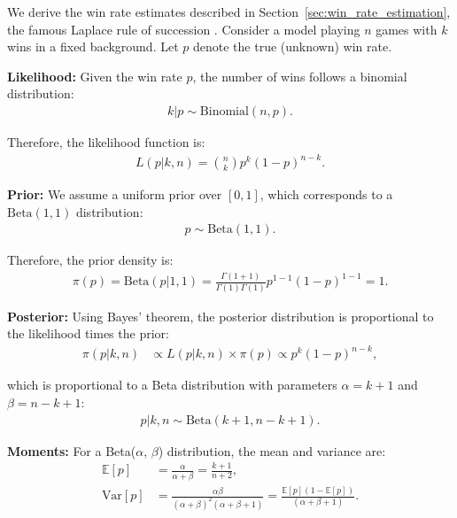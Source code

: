 \documentclass{article}
\begin{document}
    We derive the win rate estimates described in Section~\ref{sec:win_rate_estimation}, the famous Laplace rule of succession \cite{Laplace1812}. Consider a model playing $n$ games with $k$ wins in a fixed background. Let $p$ denote the true (unknown) win rate.

    \textbf{Likelihood:} Given the win rate $p$, the number of wins follows a binomial distribution:
    \begin{align}
    k | p \sim \text{Binomial}(n, p).
    \end{align}

    Therefore, the likelihood function is:
    \begin{align}
    L(p | k, n) = \binom{n}{k} p^k (1-p)^{n-k}.
    \end{align}

    \textbf{Prior:} We assume a uniform prior over $[0,1]$, which corresponds to a $\text{Beta}(1,1)$ distribution:
    \begin{align}
    p \sim  \text{Beta}(1, 1).
    \end{align}

    Therefore, the prior density is:
    \begin{align}
    \pi(p) = \text{Beta}(p | 1, 1) = \frac{\Gamma(1+1)}{\Gamma(1)\Gamma(1)} p^{1-1}(1-p)^{1-1} = 1.
    \end{align}

    \textbf{Posterior:} Using Bayes' theorem, the posterior distribution is proportional to the likelihood times the prior:
    \begin{align}
    \pi(p | k, n) &\propto L(p | k, n) \times \pi(p)\propto p^k (1-p)^{n-k},
    \end{align}

    which is proportional to a Beta distribution with parameters $\alpha = k + 1$ and $\beta = n - k + 1$:
    \begin{align}
    p | k, n \sim \text{Beta}(k + 1, n - k + 1).
    \end{align}

    \textbf{Moments:} For a Beta($\alpha$, $\beta$) distribution, the mean and variance are:
    \begin{align}
    \mathbb{E}[p] &= \frac{\alpha}{\alpha + \beta} = \frac{k + 1}{n + 2},\\
    \text{Var}[p] &= \frac{\alpha\beta}{(\alpha + \beta)^2(\alpha + \beta + 1)} = \frac{\mathbb{E}[p](1-\mathbb{E}[p])}{(\alpha+\beta+1)}.
    \end{align}
\end{document}
